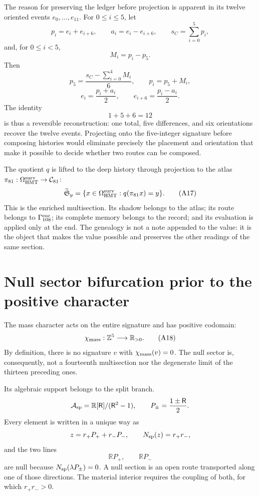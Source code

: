 The reason for preserving the ledger before projection is apparent in its twelve
oriented events \(e_0,\ldots,e_{11}\). For \(0\leq i\leq5\), let
\[
 p_i=e_i+e_{i+6},
 \qquad
 a_i=e_i-e_{i+6},
 \qquad
 s_C=\sum_{i=0}^{5}p_i,
\]
and, for \(0\leq i<5\),
\[
 M_i=p_i-p_5.
\]
Then
\[
 p_5=\frac{s_C-\sum_{i=0}^{4}M_i}{6},
 \qquad
 p_i=p_5+M_i,
\]
\[
 e_i=\frac{p_i+a_i}{2},
 \qquad
 e_{i+6}=\frac{p_i-a_i}{2}.
 \tag{A16}\label{eq:reconstruccion-registro-doce}
\]
The identity
\[
 1+5+6=12
\]
is thus a reversible reconstruction: one total, five differences, and six
orientations recover the twelve events.  Projecting onto the five-integer
signature before composing histories would eliminate precisely the placement and
orientation that make it possible to decide whether two routes can be composed.

The quotient \(q\) is lifted to the deep history through projection to the atlas
\(\pi_{81}:\Omega_{\rm HMT}^{\rm surv}\to\mathcal C_{81}\):
\[
 \widetilde{\mathfrak S}_y
 =\{x\in\Omega_{\rm HMT}^{\rm surv}:q(\pi_{81}x)=y\}.
 \tag{A17}\label{eq:multiseccion-enriquecida-rev6}
\]
This is the enriched multisection.  Its shadow belongs to the atlas; its route
belongs to \(\Gamma_{108}^{\rm enr}\); its complete memory belongs to the
record; and its evaluation is applied only at the end.  The genealogy is not a
note appended to the value: it is the object that makes the value possible and preserves the
other readings of the same section.

\section{Null sector bifurcation prior to the positive character}

The mass character acts on the entire signature and has positive codomain:
\[
 \chi_{\rm mass}:\mathbb Z^5\longrightarrow\mathbb R_{>0}.
 \tag{A18}\label{eq:caracter-positivo-atlas-rev6}
\]
By definition, there is no signature \(v\) with
\(\chi_{\rm mass}(v)=0\). The null sector is, consequently, not a
fourteenth multisection nor the degenerate limit of the thirteen preceding ones.

Its algebraic support belongs to the split branch.
\[
 \mathcal A_{\rm sp}
 =\mathbb R[\mathsf R]/(\mathsf R^2-1),
 \qquad
 P_\pm=\frac{1\pm\mathsf R}{2}.
\]
Every element is written in a unique way as
\[
 z=r_+P_++r_-P_-,
 \qquad
 N_{\rm sp}(z)=r_+r_-,
\]
and the two lines
\[
 \mathbb R P_+,\qquad\mathbb R P_-
\]
are null because \(N_{\rm sp}(\lambda P_\pm)=0\). A null section is an
open route transported along one of those directions. The material interior
requires the coupling of both, for which \(r_+r_->0\).

